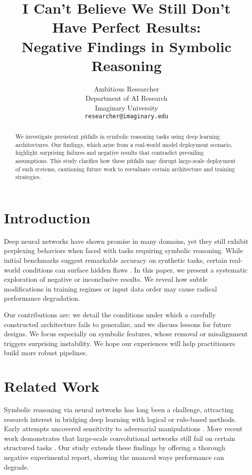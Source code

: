 \documentclass{article}
\title{I Can't Believe We Still Don't Have Perfect Results: \\ Negative Findings in Symbolic Reasoning}
\author{
  Ambitious Researcher\\
  Department of AI Research\\
  Imaginary University\\
  \texttt{researcher@imaginary.edu}
}
\date{}
\begin{document}
\maketitle

\begin{abstract}
We investigate persistent pitfalls in symbolic reasoning tasks using deep learning architectures. Our findings, which arise from a real-world model deployment scenario, highlight surprising failures and negative results that contradict prevailing assumptions. This study clarifies how these pitfalls may disrupt large-scale deployment of such systems, cautioning future work to reevaluate certain architecture and training strategies.
\end{abstract}

\section{Introduction}
Deep neural networks have shown promise in many domains, yet they still exhibit perplexing behaviors when faced with tasks requiring symbolic reasoning. While initial benchmarks suggest remarkable accuracy on synthetic tasks, certain real-world conditions can surface hidden flaws \citep{goodfellow2014explaining,he2016deep}. In this paper, we present a systematic exploration of negative or inconclusive results. We reveal how subtle modifications in training regimes or input data order may cause radical performance degradation.

Our contributions are: we detail the conditions under which a carefully constructed architecture fails to generalize, and we discuss lessons for future designs. We focus especially on symbolic features, whose removal or misalignment triggers surprising instability. We hope our experiences will help practitioners build more robust pipelines.

\section{Related Work}
Symbolic reasoning via neural networks has long been a challenge, attracting research interest in bridging deep learning with logical or rule-based methods. Early attempts uncovered sensitivity to adversarial manipulations \citep{goodfellow2014explaining}. More recent work demonstrates that large-scale convolutional networks still fail on certain structured tasks \citep{he2016deep}. Our study extends these findings by offering a thorough negative experimental report, showing the nuanced ways performance can degrade.
\end{document}

